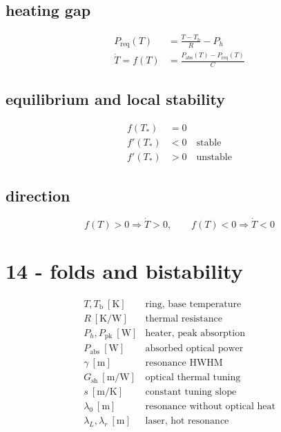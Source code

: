 \subsection*{heating gap}
\[
\displaystyle \begin{aligned}P_{\mathrm{req}}(T)&=\frac{T-T_{\mathrm b}}R-P_h\\\dot T=f(T)&=\frac{P_{\mathrm{abs}}(T)-P_{\mathrm{req}}(T)}C\end{aligned}
\]

\subsection*{equilibrium and local stability}
\[
\displaystyle \begin{aligned}f(T_*)&=0\\f'(T_*)&<0\quad\text{stable}\\f'(T_*)&>0\quad\text{unstable}\end{aligned}
\]

\subsection*{direction}
\[
\displaystyle f(T)>0\Rightarrow\dot T>0,\qquad f(T)<0\Rightarrow\dot T<0
\]

\clearpage
\section*{14 - folds and bistability}

\[
\begin{array}{ll}T,T_{\mathrm b}\ [\mathrm K]&\text{ring, base temperature}\\[0.6em]R\ [\mathrm{K/W}]&\text{thermal resistance}\\[0.6em]P_h,P_{\mathrm{pk}}\ [\mathrm W]&\text{heater, peak absorption}\\[0.6em]P_{\mathrm{abs}}\ [\mathrm W]&\text{absorbed optical power}\\[0.6em]\gamma\ [\mathrm m]&\text{resonance HWHM}\\[0.6em]G_{\mathrm{sh}}\ [\mathrm{m/W}]&\text{optical thermal tuning}\\[0.6em]s\ [\mathrm{m/K}]&\text{constant tuning slope}\\[0.6em]\lambda_0\ [\mathrm m]&\text{resonance without optical heat}\\[0.6em]\lambda_L,\lambda_r\ [\mathrm m]&\text{laser, hot resonance}\end{array}
\]

